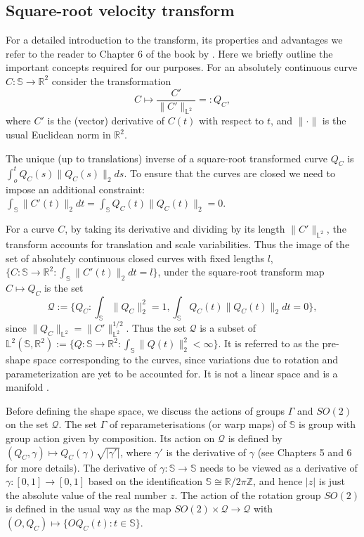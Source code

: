 \documentclass[11pt]{amsart}
\newcommand{\C}{C}
\newcommand{\Rtwo}{\mathbb{R}^2}
\newcommand{\ltwo}{\mathbb{L}^2}
\newcommand{\uc}{\mathbb{S}}
\theoremstyle{definition}
\begin{document}
\subsection{Square-root velocity transform}
For a detailed introduction to the transform, its properties and advantages we refer to the reader to Chapter 6 of the book by \cite{AK}. Here we briefly outline the important concepts required for our purposes. 
For an absolutely continuous curve $\C:\uc \to \Rtwo$ consider the transformation 
$$\C \mapsto \frac{C'}{\|C'\|_{\ltwo}}=:Q_\C,$$ 
where $\C'$ is the (vector) derivative of $\C(t)$ with respect to $t$, and $\|\cdot\|$ is the usual Euclidean norm in $\Rtwo$. 

The unique (up to translations) inverse of a square-root transformed curve $Q_C$ is $\int_o^t Q_C(s)\|Q_C(s)\|_2ds$. To ensure that the curves are closed we need to impose an additional constraint: $\int_\uc \|C'(t)\|_2dt=\int_\uc Q_C(t)\|Q_C(t)\|_2=0$.  

For a curve $\C$, by taking its derivative and dividing by its length $\|C'\|_{\ltwo}$, the transform accounts for translation and scale variabilities. Thus the image of the set of absolutely continuous closed curves with fixed lengths $l$, $ \{\C:\uc \to \Rtwo: \int_\uc \|C'(t)\|_2dt=l\}$, under the square-root transform map $\C \mapsto Q_\C$ is the set
\[
\mathcal{Q}:=\Big\{Q_\C: \int_\uc \|Q_C\|_2^2=1, \int_\uc Q_C(t)\|Q_C(t)\|_2dt=0\Big\},
\]
since $\|Q_\C\|_{\ltwo}=\|C'\|_{\ltwo}^{1/2}$. Thus the set $\mathcal{Q}$ is a subset of $\mathbb{L}^2(\uc,\Rtwo):=\{Q:\uc \to \Rtwo: \int_\uc \|Q(t)\|_2^2 <\infty \}$. It is referred to as the pre-shape space corresponding to the curves, since variations due to rotation and parameterization are yet to be accounted for. It is not a linear space and is a manifold \citep{AK}. 

Before defining the shape space, we discuss the actions of groups $\Gamma$ and $SO(2)$ on the set $\mathcal{Q}$. The set $\Gamma$ of reparameterisations (or warp maps) of $\uc$ is group with group action given by composition. Its action on $\mathcal{Q}$ is defined by $(Q_\C,\gamma) \mapsto Q_\C(\gamma) \sqrt{|\gamma '|}$, where $\gamma'$ is the derivative of $\gamma$ (see Chapters 5 and 6 \cite{AK} for more details). The derivative of $\gamma:\uc \to \uc$ needs to be viewed as a derivative of $\gamma:[0,1]\to[0,1]$ based on the identification $\uc \cong \mathbb{R}/2\pi\mathbb{Z}$, and hence $|z|$ is just the absolute value of the real number $z$. 
The action of the rotation group $SO(2)$ is defined in the usual way as the map $SO(2) \times \mathcal{Q} \to \mathcal{Q}$ with $(O,Q_C)\mapsto \{OQ_C(t): t \in \uc\}$. 
\end{document}

